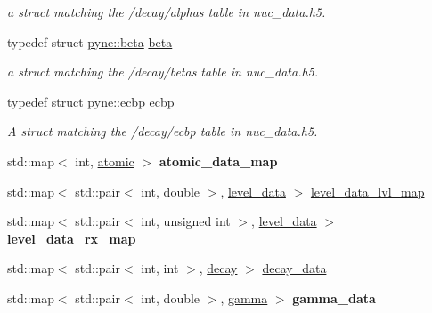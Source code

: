 \begin{DoxyCompactItemize}
\begin{DoxyCompactList}\small\item\em a struct matching the \textquotesingle{}/decay/alphas\textquotesingle{} table in nuc\+\_\+data.\+h5. \end{DoxyCompactList}\item 
typedef struct \hyperlink{structpyne_1_1beta}{pyne\+::beta} \hyperlink{namespacepyne_ae80bdf847bfa789021a5dafc132772e1}{beta}\hypertarget{namespacepyne_ae80bdf847bfa789021a5dafc132772e1}{}\label{namespacepyne_ae80bdf847bfa789021a5dafc132772e1}

\begin{DoxyCompactList}\small\item\em a struct matching the \textquotesingle{}/decay/betas\textquotesingle{} table in nuc\+\_\+data.\+h5. \end{DoxyCompactList}\item 
typedef struct \hyperlink{structpyne_1_1ecbp}{pyne\+::ecbp} \hyperlink{namespacepyne_a172aa77622d272744ca413d8e1f89735}{ecbp}\hypertarget{namespacepyne_a172aa77622d272744ca413d8e1f89735}{}\label{namespacepyne_a172aa77622d272744ca413d8e1f89735}

\begin{DoxyCompactList}\small\item\em A struct matching the \textquotesingle{}/decay/ecbp\textquotesingle{} table in nuc\+\_\+data.\+h5. \end{DoxyCompactList}\item 
std\+::map$<$ int, \hyperlink{structpyne_1_1atomic}{atomic} $>$ {\bfseries atomic\+\_\+data\+\_\+map}\hypertarget{namespacepyne_ac53d31be0627daff52e6f9b4afc13ab5}{}\label{namespacepyne_ac53d31be0627daff52e6f9b4afc13ab5}

\item 
std\+::map$<$ std\+::pair$<$ int, double $>$, \hyperlink{structpyne_1_1level__data}{level\+\_\+data} $>$ \hyperlink{namespacepyne_aa5b6136e3970959756640b867754bb62}{level\+\_\+data\+\_\+lvl\+\_\+map}
\item 
std\+::map$<$ std\+::pair$<$ int, unsigned int $>$, \hyperlink{structpyne_1_1level__data}{level\+\_\+data} $>$ {\bfseries level\+\_\+data\+\_\+rx\+\_\+map}\hypertarget{namespacepyne_ae1858b7f76aa7faa5c758f6a42332202}{}\label{namespacepyne_ae1858b7f76aa7faa5c758f6a42332202}

\item 
std\+::map$<$ std\+::pair$<$ int, int $>$, \hyperlink{structpyne_1_1decay}{decay} $>$ \hyperlink{namespacepyne_ac880c3701eca3453cb9cdfab30195d65}{decay\+\_\+data}
\item 
std\+::map$<$ std\+::pair$<$ int, double $>$, \hyperlink{structpyne_1_1gamma}{gamma} $>$ {\bfseries gamma\+\_\+data}\hypertarget{namespacepyne_a590557e517e261616148c1643e72ddb2}{}\label{namespacepyne_a590557e517e261616148c1643e72ddb2}


\end{DoxyCompactItemize}
